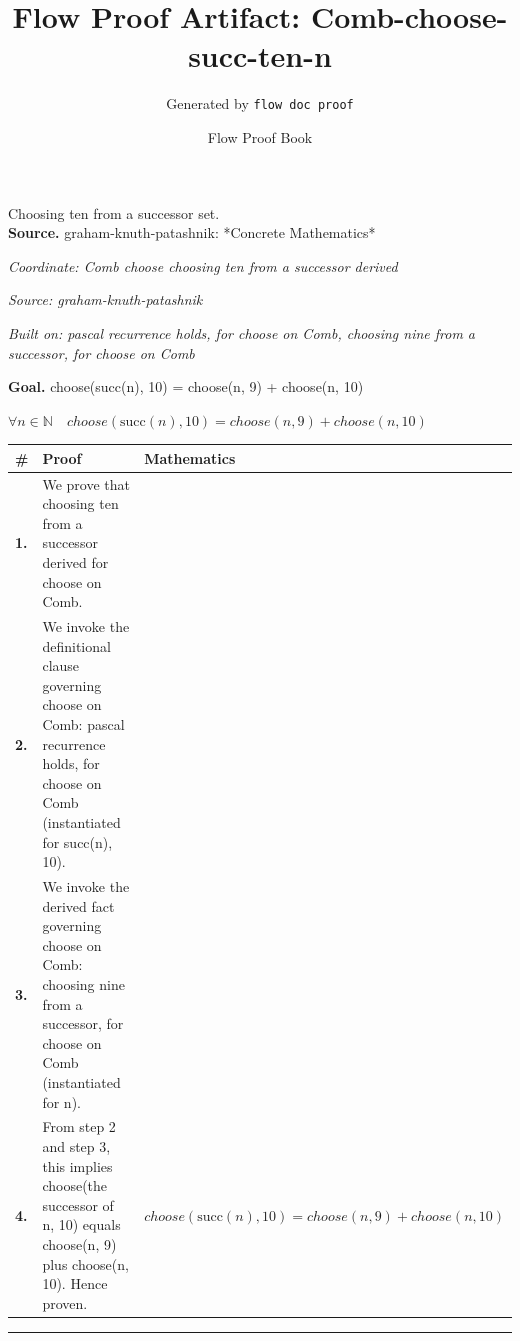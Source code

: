 \documentclass[11pt]{article}
\title{Flow Proof Artifact: Comb-choose-succ-ten-n}
\author{Generated by \texttt{flow doc proof}}
\date{Flow Proof Book}
\theoremstyle{definition}
\begin{document}
\maketitle
Choosing ten from a successor set.\\[0.5em]
\textbf{Source.} graham-knuth-patashnik: *Concrete Mathematics*\\[0.5em]
\bigskip
{}\par
\smallskip\noindent\textit{Coordinate: Comb \cdot choose \cdot choosing ten from a successor derived}\par
\smallskip\noindent\textit{Source: graham-knuth-patashnik}\par
\smallskip\noindent\textit{Built on: pascal recurrence holds, for choose on Comb, choosing nine from a successor, for choose on Comb}\par
\medskip
\noindent\textbf{Goal.} choose(succ(n), 10) = choose(n, 9) + choose(n, 10)\par
\noindent$\displaystyle \forall n \in \mathbb{N}\quad choose(\mathrm{succ}(n), 10) = choose(n, 9) + choose(n, 10)$\par
\medskip
\noindent
\begin{tabular}{@{} >{\raggedright\arraybackslash}p{} >{\raggedright\arraybackslash}p{} >{\raggedleft\arraybackslash}p{} @{}}
\textbf{\#} & \textbf{Proof} & \textbf{Mathematics} \\
\midrule
\textbf{1.} & We prove that choosing ten from a successor derived for choose on Comb. & \\[0.45em]
\textbf{2.} & We invoke the definitional clause governing choose on Comb: pascal recurrence holds, for choose on Comb (instantiated for succ(n), 10). & \\[0.45em]
\textbf{3.} & We invoke the derived fact governing choose on Comb: choosing nine from a successor, for choose on Comb (instantiated for n). & \\[0.45em]
\textbf{4.} & From step 2 and step 3, this implies choose(the successor of n, 10) equals choose(n, 9) plus choose(n, 10). Hence proven. & $\displaystyle choose(\mathrm{succ}(n), 10) = choose(n, 9) + choose(n, 10)$ \\[0.45em]
\bottomrule
\end{tabular}
\label{thm:Comb-choose-choosing_ten_from_a_successor_derived}
\par\medskip\hrule
\end{document}
